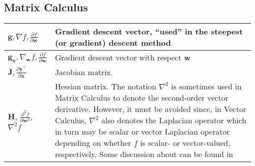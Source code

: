 \documentclass{article}
\begin{document}
\subsection{Matrix Calculus}
\begin{xltabular}{\textwidth}{XX}
	\(\mathbf{g}, \nabla f, \frac{\partial f}{\partial \mathbf{w}}\)                                                       & Gradient descent vector, ``used'' in the steepest (or gradient) descent method                                                                                                                                                                                                                                                                                                                                                             \\ \hline
	\(\mathbf{g}_{\mathbf{x}}, \nabla_{\mathbf{w}}f, \frac{\partial f}{\partial \mathbf{w}}\)                              & Gradient descent vector with respect \(\mathbf{w}\) \cite{bishopPatternRecognitionMachine2006}                                                                                                                                                                                                                                                                                                                                             \\ \hline
	\(\mathbf{J}, \frac{\partial \mathbf{y}^{\top}}{\partial \mathbf{x}}\)                                                 & Jacobian matrix.                                                                                                                                                                                                                                                                                                                                                                                                                           \\ \hline
	\(\mathbf{H}\), \(\frac{\partial^2 f}{\partial \mathbf{w}^2}\), \(\nabla^2 f\) \cite{haykinNeuralNetworksLearning2009} & Hessian matrix. The notation \(\nabla^2\) is sometimes used in Matrix Calculus to denote the second-order vector derivative. However, it must be avoided since, in Vector Calculus, \(\nabla^2\) also denotes the Laplacian operator which in turn may be scalar or vector Laplacian operator depending on whether \(f\) is scalar- or vector-valued, respectively. Some discussion about can be found in \cite{4693212, 1353761, 4560326} \\ \hline
\end{xltabular}
\end{document}

